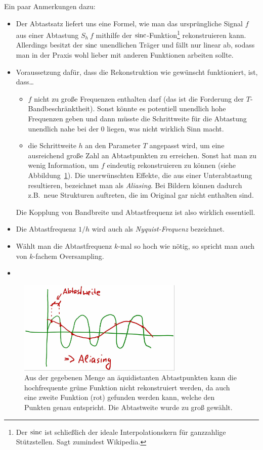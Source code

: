 \begin{remark}
Ein paar Anmerkungen dazu:
\begin{itemize}
\item Der Abtastsatz liefert uns eine Formel, wie man das ursprüngliche Signal $ f $ aus einer
  Abtastung $ S_{h} \ f $ mithilfe der $ \operatorname{sinc} $-Funktion\footnote{Der $ \operatorname{sinc} $ ist schließlich 
  der ideale Interpolationskern für ganzzahlige Stützstellen. Sagt zumindest Wikipedia.} 
  rekonstruieren kann. Allerdings besitzt der $ \operatorname{sinc} $ unendlichen Träger und fällt nur linear ab, 
  sodass man in der Praxis wohl lieber mit anderen Funktionen arbeiten sollte. 
\item Voraussetzung dafür, dass die Rekonstruktion wie gewünscht funktioniert, ist, dass\dots
  \begin{itemize}
  \item $ f $ nicht zu große Frequenzen enthalten darf (das ist die Forderung der
    $ T $-Bandbeschränktheit). Sonst könnte es potentiell unendlich hohe Frequenzen geben und dann
    müsste die Schrittweite für die Abtastung unendlich nahe bei der $ 0 $ liegen, was nicht
    wirklich Sinn macht.
  \item die Schrittweite $ h $ an den Parameter $ T $ angepasst wird, um eine ausreichend große 
    Zahl an Abtastpunkten zu erreichen. Sonst hat man zu wenig Information, um $ f $ eindeutig 
    rekonstruieren zu können (siehe Abbildung~\ref{fig:aliasing}). Die unerwünschten Effekte, die 
    aus einer Unterabtastung resultieren, bezeichnet man als \emph{Aliasing}. Bei Bildern können 
    dadurch z.B.\ neue Strukturen auftreten, die im Original gar nicht enthalten sind.
  \end{itemize}
  Die Kopplung von Bandbreite und Abtastfrequenz ist also wirklich essentiell. 
\item Die Abtastfrequenz $ 1 / h $ wird auch als \emph{Nyquist-Frequenz} bezeichnet.
\item Wählt man die Abtastfrequenz $ k $-mal so hoch wie nötig, so spricht man auch von
  $ k $-fachem Oversampling.
\item {}
\end{itemize}
\end{remark}

\begin{figure}[ht]
	\centering
  \includegraphics[width=0.7\textwidth]{Bilder/Aliasing}
	\caption{Aus der gegebenen Menge an äquidistanten Abtastpunkten kann die hochfrequente 
	grüne Funktion nicht rekonstruiert werden, da auch eine zweite Funktion (rot) gefunden werden 
	kann, welche den Punkten genau entspricht. Die Abtastweite wurde zu groß gewählt.}
	\label{fig:aliasing}
\end{figure}